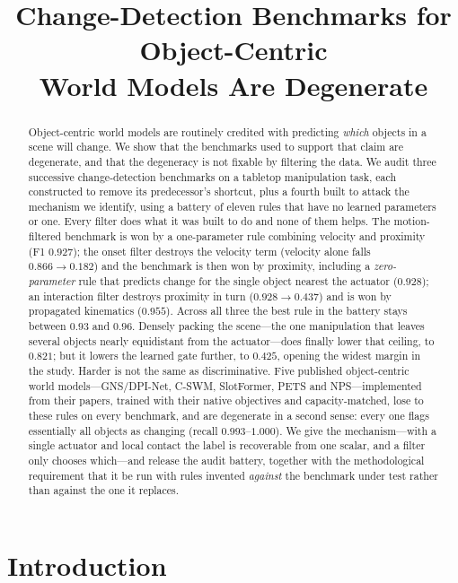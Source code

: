 \documentclass{article}
\title{Change-Detection Benchmarks for Object-Centric \\ World Models Are Degenerate}
\begin{document}
\maketitle

\begin{abstract}
Object-centric world models are routinely credited with predicting \emph{which} objects in a
scene will change. We show that the benchmarks used to support that claim are degenerate, and
that the degeneracy is not fixable by filtering the data.
We audit three successive change-detection benchmarks on a tabletop manipulation task, each
constructed to remove its predecessor's shortcut, plus a fourth built to attack the mechanism
we identify, using a battery of eleven rules that have no learned parameters or one.
Every filter does what it was built to do and none of them helps. The motion-filtered
benchmark is won by a one-parameter rule combining velocity and proximity (F1 $0.927$); the
onset filter destroys the velocity term (velocity alone falls $0.866 \rightarrow 0.182$) and
the benchmark is then won by proximity, including a \emph{zero-parameter} rule that predicts
change for the single object nearest the actuator ($0.928$); an interaction filter destroys
proximity in turn ($0.928 \rightarrow 0.437$) and is won by propagated kinematics ($0.955$).
Across all three the best rule in the battery stays between $0.93$ and $0.96$.
Densely packing the scene---the one manipulation that leaves several objects nearly equidistant
from the actuator---does finally lower that ceiling, to $0.821$; but it lowers the learned gate
further, to $0.425$, opening the widest margin in the study. Harder is not the same as
discriminative.
Five published object-centric world models---GNS/DPI-Net, C-SWM, SlotFormer, PETS and
NPS---implemented from their papers, trained with their native objectives and capacity-matched,
lose to these rules on every benchmark, and are degenerate in a second sense: every one flags
essentially all objects as changing (recall $0.993$--$1.000$).
We give the mechanism---with a single actuator and local contact the label is recoverable from
one scalar, and a filter only chooses which---and release the audit battery, together with the
methodological requirement that it be run with rules invented \emph{against} the benchmark
under test rather than against the one it replaces.
\end{abstract}

\section{Introduction}
\end{document}
